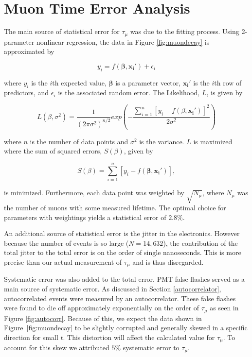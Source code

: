
\section{Muon Time Error Analysis}\label{muontimeerroranalysis}

The main source of statistical error for $\tau_{\mu}$ was due to the fitting process.  Using 2-parameter nonlinear regression, the data in Figure \ref{fig:muondecay} is approximated by

\begin{equation}
\label{nonlinfit}
y_{i}=f(\mathbf{\beta},\mathbf{x_{i}'})+\epsilon_{i}
\end{equation}

where $y_{i}$ is the $i$th expected value, $\mathbf{\beta}$ is a parameter vector, $\mathbf{x_{i}'}$ is the $i$th row of predictors, and $\epsilon_{i}$ is the associated random error.  The Likelihood, $L$, is given by 

\begin{equation}
\label{likelihood}
L(\beta,\sigma^{2})=\frac{1}{(2\pi\sigma^{2})^{n/2}}exp(-\frac{\sum_{i=1}^{n}[y_{i}-f(\beta,\mathbf{x_{i}'})]^{2}}{2\sigma^{2}})
\end{equation}

where $n$ is the number of data points and $\sigma^{2}$ is the variance. $L$ is maximized where the sum of squared errors, $S(\beta)$, given by

\begin{equation}
\label{sse}
S(\beta) = \sum_{i=1}^{n}[y_{i}-f(\mathbf{\beta},\mathbf{x_{i}'})],
\end{equation}

is minimized.  Furthermore, each data point was weighted by $\sqrt{N_{\mu}}$, where $N_{\mu}$ was the number of muons with some measured lifetime.  The optimal choice for parameters with weightings yields a statistical error of $2.8\%$.  

An additional source of statistical error is the jitter in the electronics.  However because the number of events is so large ($N=14,632$), the contribution of the total jitter to the total error is on the order of single nanoseconds.  This is more precise than our actual measurement of $\tau_{\mu}$ and is thus disregarded.
 
Systematic error was also added to the total error.  PMT false flashes served as a main source of systematic error.  As discussed in Section \ref{autocorrelator}, autocorrelated events were measured by an autocorrelator. These false flashes were found to die off approximately exponentially on the order of $\tau_{\mu}$ as seen in Figure \ref{fig:autocorr}.  Because of this, we expect the data shown in Figure~\ref{fig:muondecay} to be slightly corrupted and generally skewed in a specific direction for small $t$.  This distortion will affect the calculated value for $\tau_{\mu}$.  To account for this skew we attributed $5\%$ systematic error to $\tau_{\mu}$.

